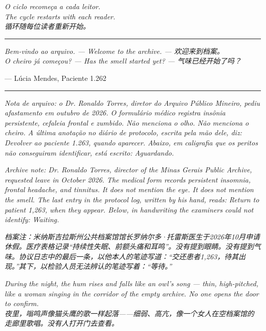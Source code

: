 \documentclass[14pt,openany]{extbook}
\begin{document}
\begin{center}
\vspace{2em}
\textit{O ciclo recomeça a cada leitor.\\[0.3em]
The cycle restarts with each reader.\\[0.3em]
循环随每位读者重新开始。}

\vspace{2em}
\rule{0.3\textwidth}{0.5pt}

\vspace{2em}
\textit{Bem-vindo ao arquivo. --- Welcome to the archive. --- 欢迎来到档案。}\\[0.6em]
\textit{O cheiro já começou? --- Has the smell started yet? --- 气味已经开始了吗？}

\vspace{1.5em}
--- Lúcia Mendes, Paciente 1.262

\vspace{0.5em}
\rule{0.3\textwidth}{0.5pt}

\vspace{0.5em}
\noindent\textit{Nota de arquivo: o Dr. Ronaldo Torres, diretor do Arquivo Público Mineiro, pediu afastamento em outubro de 2026. O formulário médico registra \textquotedbl{}insônia persistente, cefaleia frontal e zumbido.\textquotedbl{} Não menciona o olho. Não menciona o cheiro. A última anotação no diário de protocolo, escrita pela mão dele, diz: \textquotedbl{}Devolver ao paciente 1.263, quando aparecer.\textquotedbl{} Abaixo, em caligrafia que os peritos não conseguiram identificar, está escrito: \textquotedbl{}Aguardando.\textquotedbl{}}

\vspace{0.3em}
\noindent\textit{Archive note: Dr. Ronaldo Torres, director of the Minas Gerais Public Archive, requested leave in October 2026. The medical form records \textquotedbl{}persistent insomnia, frontal headache, and tinnitus.\textquotedbl{} It does not mention the eye. It does not mention the smell. The last entry in the protocol log, written by his hand, reads: \textquotedbl{}Return to patient 1,263, when they appear.\textquotedbl{} Below, in handwriting the examiners could not identify: \textquotedbl{}Waiting.\textquotedbl{}}

\vspace{0.3em}
\noindent\textit{档案注：米纳斯吉拉斯州公共档案馆馆长罗纳尔多·托雷斯医生于2026年10月申请休假。医疗表格记录“持续性失眠、前额头痛和耳鸣”。没有提到眼睛。没有提到气味。协议日志中的最后一条，以他本人的笔迹写道：“交还患者1,263，待其出现。”其下，以检验人员无法辨认的笔迹写着：“等待。”}

\vspace{0.3em}
\noindent\textit{During the night, the hum rises and falls like an owl's song --- thin, high-pitched, like a woman singing in the corridor of the empty archive. No one opens the door to confirm. \\[0.3em] 夜里，嗡鸣声像猫头鹰的歌一样起落——细弱、高亢，像一个女人在空档案馆的走廊里歌唱。没有人打开门去查看。}
\end{center}
\end{document}
